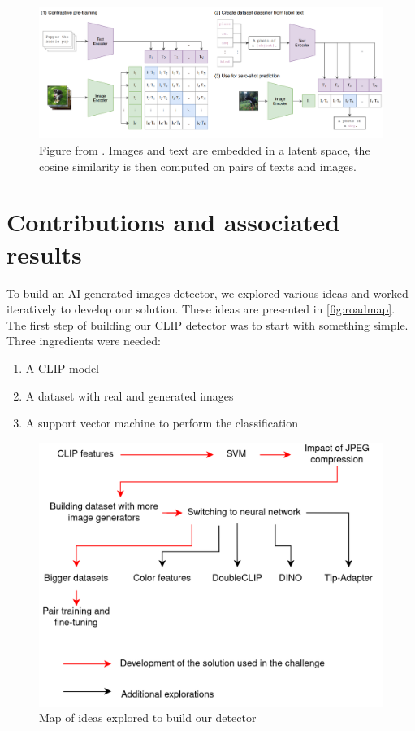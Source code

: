 \documentclass[12pt,a4paper]{article}
\begin{document}
\begin{figure}[H]
    \includegraphics*[width=\textwidth]{img/CLIP.png}
    \caption{Figure from \autocite*{radfordLearningTransferableVisual2021}. Images and text are embedded in a latent space, the cosine similarity is then computed on pairs of texts and images.}
\end{figure}

\section{Contributions and associated results}
To build an AI-generated images detector, we explored various ideas and worked iteratively to develop our solution. These ideas are presented in \autoref*{fig:roadmap}.\\
The first step of building our CLIP detector was to start with something simple. Three ingredients were needed:
\begin{enumerate}
    \item A CLIP model
    \item A dataset with real and generated images
    \item A support vector machine to perform the classification
\end{enumerate}

\begin{figure}[H]
    \includegraphics*[width=\textwidth]{img/roadmap.png}
    \caption{Map of ideas explored to build our detector}
    \label{fig:roadmap}
\end{figure}
\end{document}

